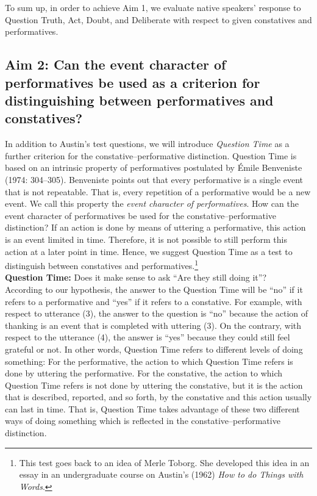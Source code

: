 \documentclass[egregdoesnotlikesansseriftitles,12pt]{scrartcl}
\begin{document}
\noindent To sum up, in order to achieve Aim 1, we evaluate native speakers' response to Question Truth, Act, Doubt, and Deliberate with respect to given constatives and performatives.


\subsection{Aim 2: Can the event character of performatives be used as a criterion for distinguishing between performatives and constatives?}
In addition to Austin's test questions, we will introduce \textit{Question Time} as a further criterion for the constative--performative distinction. Question Time is based on an intrinsic property of performatives postulated by \'{E}mile Benveniste (1974: 304--305). Benveniste points out that every performative is a single event that is not repeatable. That is, every repetition of a performative would be a new event. We call this property the \textit{event character of performatives}. How can the event character of performatives be used for the constative--performative distinction? If an action is done by means of uttering a performative, this action is an event limited in time. Therefore, it is not possible to still perform this action at a later point in time. Hence, we suggest Question Time as a test to distinguish between constatives and performatives.\footnote{This test goes back to an idea of Merle Toborg. She developed this idea in an essay in an undergraduate course on Austin's (1962) \textit{How to do Things with Words}.}\\

\textbf{Question Time:} Does it make sense to ask ``Are they still doing it''?\\

\noindent According to our hypothesis, the answer to the Question Time will be ``no'' if it refers to a performative and ``yes'' if it refers to a constative. For example, with respect to utterance (3), the answer to the question is ``no'' because the action of thanking is an event that is completed with uttering (3). On the contrary, with respect to the utterance (4), the answer is ``yes'' because they could still feel grateful or not. In other words, Question Time refers to different levels of doing something: For the performative, the action to which Question Time refers is done by uttering the performative. For the constative, the action to which Question Time refers is not done by uttering the constative, but it is the action that is described, reported, and so forth, by the constative and this action usually can last in time. That is, Question Time takes advantage of these two different ways of doing something which is reflected in the constative--performative distinction.
\end{document}
